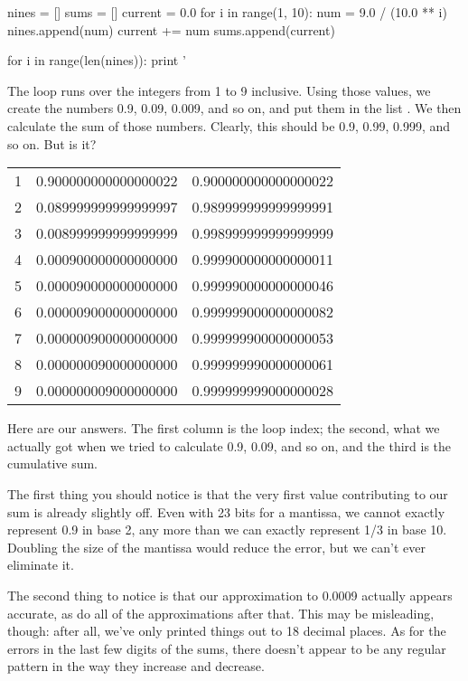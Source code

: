 \begin{VerbIn}
nines = []
sums = []
current = 0.0
for i in range(1, 10):
    num = 9.0 / (10.0 ** i)
    nines.append(num)
    current += num
    sums.append(current)

for i in range(len(nines)):
    print '%
\end{VerbIn}

The loop runs over the integers from 1 to 9 inclusive. Using those
values, we create the numbers 0.9, 0.09, 0.009, and so on, and put them
in the list . We then calculate the sum of those numbers.
Clearly, this should be 0.9, 0.99, 0.999, and so on. But is it?

\begin{tabular}{lll}
1 & 0.900000000000000022 & 0.900000000000000022 \\
2 & 0.089999999999999997 & 0.989999999999999991 \\
3 & 0.008999999999999999 & 0.998999999999999999 \\
4 & 0.000900000000000000 & 0.999900000000000011 \\
5 & 0.000090000000000000 & 0.999990000000000046 \\
6 & 0.000009000000000000 & 0.999999000000000082 \\
7 & 0.000000900000000000 & 0.999999900000000053 \\
8 & 0.000000090000000000 & 0.999999990000000061 \\
9 & 0.000000009000000000 & 0.999999999000000028 \\
\end{tabular}

Here are our answers. The first column is the loop index; the second,
what we actually got when we tried to calculate 0.9, 0.09, and so on,
and the third is the cumulative sum.

The first thing you should notice is that the very first value
contributing to our sum is already slightly off. Even with 23 bits for a
mantissa, we cannot exactly represent 0.9 in base 2, any more than we
can exactly represent 1/3 in base 10. Doubling the size of the mantissa
would reduce the error, but we can't ever eliminate it.

The second thing to notice is that our approximation to 0.0009 actually
appears accurate, as do all of the approximations after that. This may
be misleading, though: after all, we've only printed things out to 18
decimal places. As for the errors in the last few digits of the sums,
there doesn't appear to be any regular pattern in the way they increase
and decrease.

